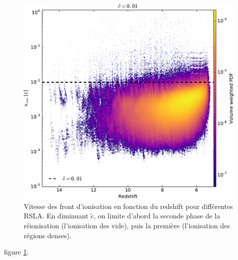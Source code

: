 \begin{figure}[htpb]
		\includegraphics[height=.3\textheight]{img/04_mapreio/speedreio_z_c001.pdf} 
        \caption{Vitesse des front d'ionisation en fonction du redshift pour différentes RSLA.
        En diminuant $\tilde{c}$, on limite d'abord la seconde phase de la réionisation (l'ionisation des vide), puis la première (l'ionisation des régions denses).
        }        
 		\label{fig:vreioz}
\end{figure}



figure \ref{fig:vreioz}.

